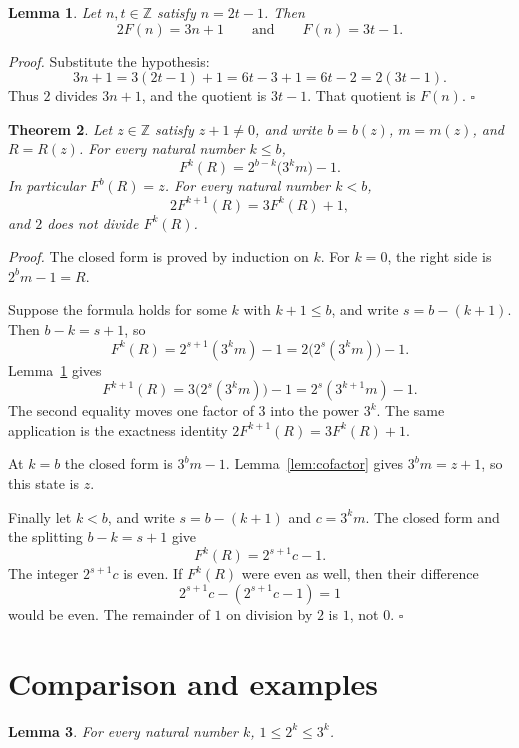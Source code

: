 \documentclass[11pt,letterpaper]{article}
\newcommand{\Z}{\mathbb{Z}}
\newtheorem{theorem}{Theorem}
\newtheorem{lemma}[theorem]{Lemma}
\newenvironment{proof}{\noindent\textit{Proof.}}{\hfill\(\square\)}
\begin{document}
\begin{lemma}
\label{lem:forward-step}
Let \(n,t\in\Z\) satisfy \(n=2t-1\). Then
\[
2F(n)=3n+1
\qquad\text{and}\qquad
F(n)=3t-1.
\]
\end{lemma}

\begin{proof}
Substitute the hypothesis:
\[
3n+1=3(2t-1)+1=6t-3+1=6t-2=2(3t-1).
\]
Thus \(2\) divides \(3n+1\), and the quotient is \(3t-1\). That quotient is \(F(n)\).
\end{proof}

\begin{theorem}
\label{thm:forward-return}
Let \(z\in\Z\) satisfy \(z+1\neq 0\), and write \(b=b(z)\), \(m=m(z)\), and \(R=R(z)\). For every natural number \(k\leq b\),
\[
F^k(R)=2^{b-k}\bigl(3^km\bigr)-1.
\]
In particular \(F^b(R)=z\). For every natural number \(k<b\),
\[
2F^{k+1}(R)=3F^k(R)+1,
\]
and \(2\) does not divide \(F^k(R)\).
\end{theorem}

\begin{proof}
The closed form is proved by induction on \(k\). For \(k=0\), the right side is \(2^bm-1=R\).

Suppose the formula holds for some \(k\) with \(k+1\leq b\), and write \(s=b-(k+1)\). Then \(b-k=s+1\), so
\[
F^k(R)=2^{s+1}(3^km)-1=2\bigl(2^s(3^km)\bigr)-1.
\]
Lemma~\ref{lem:forward-step} gives
\[
F^{k+1}(R)=3\bigl(2^s(3^km)\bigr)-1=2^s(3^{k+1}m)-1.
\]
The second equality moves one factor of \(3\) into the power \(3^k\). The same application is the exactness identity \(2F^{k+1}(R)=3F^k(R)+1\).

At \(k=b\) the closed form is \(3^bm-1\). Lemma~\ref{lem:cofactor} gives \(3^bm=z+1\), so this state is \(z\).

Finally let \(k<b\), and write \(s=b-(k+1)\) and \(c=3^km\). The closed form and the splitting \(b-k=s+1\) give
\[
F^k(R)=2^{s+1}c-1.
\]
The integer \(2^{s+1}c\) is even. If \(F^k(R)\) were even as well, then their difference
\[
2^{s+1}c-(2^{s+1}c-1)=1
\]
would be even. The remainder of \(1\) on division by \(2\) is \(1\), not \(0\).
\end{proof}

\section{Comparison and examples}

\begin{lemma}
\label{lem:two-three-powers}
For every natural number \(k\), \(1\leq 2^k\leq 3^k\).
\end{lemma}
\end{document}

